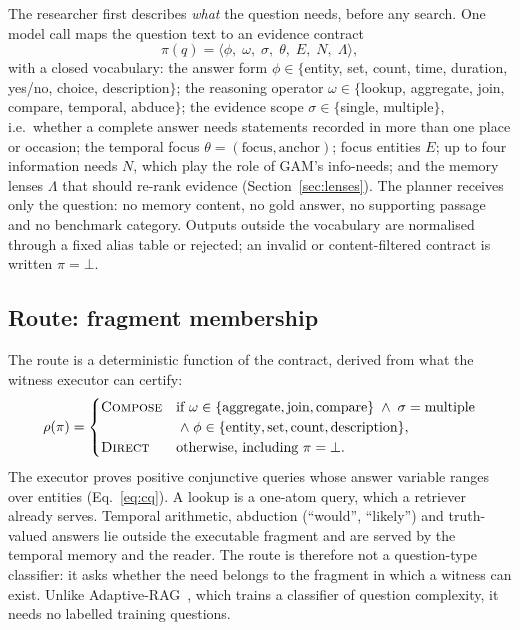 The researcher first describes \emph{what} the question needs, before any
search. One model call maps the question text to an evidence contract
\begin{equation}
  \pi(q)=\langle \phi,\;\omega,\;\sigma,\;\theta,\;E,\;N,\;\Lambda\rangle,
  \label{eq:contract}
\end{equation}
with a closed vocabulary:
the answer form $\phi\in\{$entity, set, count, time, duration, yes/no, choice,
description$\}$;
the reasoning operator $\omega\in\{$lookup, aggregate, join, compare,
temporal, abduce$\}$;
the evidence scope $\sigma\in\{$single, multiple$\}$, i.e.\ whether a complete
answer needs statements recorded in more than one place or occasion;
the temporal focus $\theta=(\text{focus},\text{anchor})$;
focus entities $E$; up to four information needs $N$, which play the role of
GAM's info-needs; and the memory lenses $\Lambda$ that should re-rank evidence
(Section~\ref{sec:lenses}).
The planner receives only the question: no memory content, no gold answer,
no supporting passage and no benchmark category. Outputs outside the
vocabulary are normalised through a fixed alias table or rejected; an invalid
or content-filtered contract is written $\pi=\bot$.

\subsection{Route: fragment membership}\label{sec:route}

The route is a deterministic function of the contract, derived from what the
witness executor can certify:
\begin{equation}
  \rho(\pi)=
  \begin{cases}
    \textsc{Compose} & \text{if } \omega\in\{\text{aggregate},\text{join},\text{compare}\}
      \;\wedge\; \sigma=\text{multiple}\\
      & \;\wedge\; \phi\in\{\text{entity},\text{set},\text{count},\text{description}\},\\
    \textsc{Direct} & \text{otherwise, including } \pi=\bot.
  \end{cases}
  \label{eq:route}
\end{equation}
The executor proves positive conjunctive queries whose answer variable ranges
over entities (Eq.~\ref{eq:cq}). A lookup is a one-atom query, which a
retriever already serves. Temporal arithmetic, abduction (``would'',
``likely'') and truth-valued answers lie outside the executable fragment and
are served by the temporal memory and the reader. The route is therefore not a
question-type classifier: it asks whether the need belongs to the fragment in
which a witness can exist. Unlike Adaptive-RAG~\cite{jeong2024adaptiverag},
which trains a classifier of question complexity, it needs no labelled
training questions.

